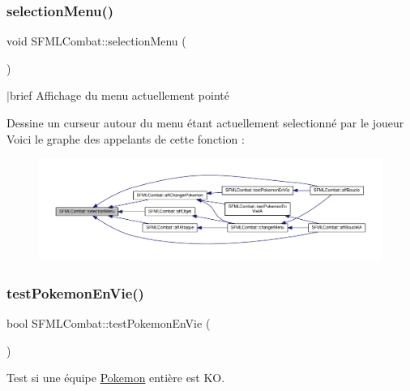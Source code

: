 \subsubsection{\texorpdfstring{selection\+Menu()}{selectionMenu()}}
{\footnotesize\ttfamily void S\+F\+M\+L\+Combat\+::selection\+Menu (\begin{DoxyParamCaption}{ }\end{DoxyParamCaption})\hspace{0.3cm}{\ttfamily [private]}}

$\vert$brief Affichage du menu actuellement pointé

Dessine un curseur autour du menu étant actuellement selectionné par le joueur Voici le graphe des appelants de cette fonction \+:\nopagebreak
\begin{figure}[H]
\begin{center}
\leavevmode
\includegraphics[width=350pt]{class_s_f_m_l_combat_a9a9295e8e7f369f0443ee5618004f0d9_icgraph}
\end{center}
\end{figure}
\mbox{\label{class_s_f_m_l_combat_af7ddb137c3bbaff70d2c566137c2cbb7}} 
\subsubsection{\texorpdfstring{test\+Pokemon\+En\+Vie()}{testPokemonEnVie()}}
{\footnotesize\ttfamily bool S\+F\+M\+L\+Combat\+::test\+Pokemon\+En\+Vie (\begin{DoxyParamCaption}{ }\end{DoxyParamCaption})\hspace{0.3cm}{\ttfamily [private]}}



Test si une équipe \hyperlink{class_pokemon}{Pokemon} entière est KO. 

